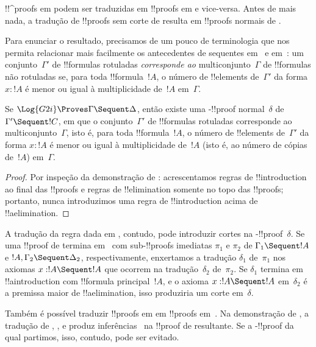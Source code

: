 \documentclass[../../../include/open-logic-section]{subfiles}
\begin{document}


!!^{proof}s em  podem ser traduzidas em !!{proof}s em 
e vice-versa. Antes de mais nada, a tradução de !!{proof}s sem corte
de  resulta em !!{proof}s normais de .

Para enunciar o resultado, precisamos de um pouco de terminologia que nos
permita relacionar mais facilmente os antecedentes de sequentes em~
e em~: um conjunto~$\Gamma'$ de !!{formula}s rotuladas
\emph{corresponde ao} multiconjunto~$\Gamma$ de !!{formula}s não rotuladas
se, para toda !!{formula}~$!A$, o número de !!{element}s de~$\Gamma'$ da
forma $x : !A$ é menor ou igual à multiplicidade de~$!A$
em~$\Gamma$.

\begin{cor}
Se $\Log{G2i} \Proves \Gamma \Sequent \Delta$, então existe uma
-!!{proof} normal~$\delta$ de $\Gamma' \Sequent !C$, em que o
conjunto~$\Gamma'$ de !!{formula}s rotuladas corresponde ao
multiconjunto~$\Gamma$, isto é, para toda !!{formula}~$!A$, o número de
!!{element}s de~$\Gamma'$ da forma $x : !A$ é menor ou igual à
multiplicidade de~$!A$ (isto é, ao número de cópias de~$!A$)
em~$\Gamma$.
\end{cor}

\begin{proof}
Por inspeção da demonstração de :
acrescentamos regras de !!{introduction} ao final das !!{proof}s e regras
de !!{elimination} somente no topo das !!{proof}s; portanto, nunca
introduzimos uma regra de !!{introduction} acima de !!a{elimination}.
\end{proof}

A tradução da regra \Cut{} dada em
, contudo, pode introduzir cortes na
-!!{proof}~$\delta$. Se uma !!{proof} de  termina em~\Cut{}
com sub-!!{proof}s imediatas $\pi_1$ e $\pi_2$ de $\Gamma_1
\Sequent !A$ e $!A, \Gamma_2 \Sequent \Delta_2$, respectivamente,
enxertamos a tradução $\delta_1$ de~$\pi_1$ nos axiomas $x:!A
\Sequent !A$ que ocorrem na tradução~$\delta_2$ de~$\pi_2$. Se
$\delta_1$ termina em !!a{introduction} com !!{formula}
principal~$!A$, e o axioma $x:!A \Sequent !A$ em~$\delta_2$ é a
premissa maior de !!a{elimination}, isso produziria um corte
em~$\delta$.

Também é possível traduzir !!{proof}s em  em !!{proof}s
em~. Na demonstração de , a
tradução de \Elim{\land}, \Elim{\lif}, \Elim{\lnot} e
\Elim{\lforall} produz inferências~\Cut{} na !!{proof} de 
resultante. Se a -!!{proof} da qual partimos, isso, contudo,
pode ser evitado.
\end{document}
